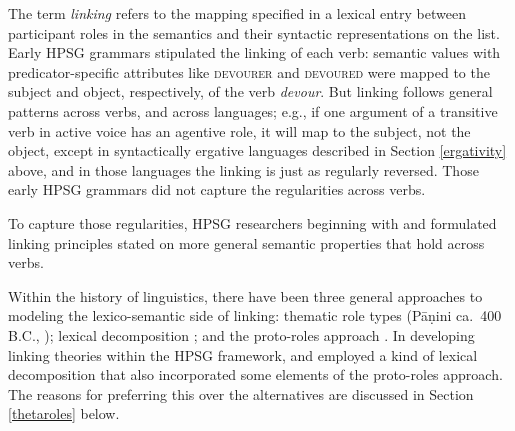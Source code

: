\documentclass[output=paper
                ,modfonts
                ,nonflat
	        ,collection
	        ,collectionchapter
	        ,collectiontoclongg
 	        ,biblatex
                ,babelshorthands
                ,newtxmath
                ,draftmode
                ,colorlinks, citecolor=brown
]{./langsci/langscibook}
\begin{document}
The term \textit{linking} refers to the mapping specified in a lexical entry between participant roles  in the semantics and their syntactic representations on the \argst list.  
Early HPSG grammars stipulated the linking of each verb:  semantic \content values with predicator-specific attributes like \textsc{devourer} and \textsc{devoured} were mapped to the subject and object, respectively, of the verb \textit{devour}.  But linking follows general patterns across verbs, and across languages; e.g., if one argument of a transitive verb in active voice has an agentive role, it will map to the subject, not the object, 
except in syntactically ergative languages described in Section \ref{ergativity} above, and in those languages the linking is just as regularly reversed.
Those early HPSG grammars did not capture the regularities across verbs.  

To capture those regularities, HPSG researchers beginning with \citet{Wechsler1995b} and \citet{Davis1996} formulated linking principles stated on more general semantic properties that hold across verbs.  

Within the history of linguistics, there have been three general approaches to modeling the lexico-semantic side of linking: thematic role types 
(P\={a}\d{n}ini ca.\ 400 B.C., \citealt{Fillmore1968}); lexical decomposition  \citep{FoleyandvanValin1984,RappaportandLevin1998}; and the proto-roles approach  \citep{Dowty1991}.   In developing linking theories within the HPSG framework, \citet{Wechsler1995b} and \citet{Davis1996} employed a kind of lexical decomposition that also incorporated some elements of the proto-roles approach.  The reasons for preferring this over the alternatives are discussed in Section \ref{thetaroles} below.  
\end{document}
